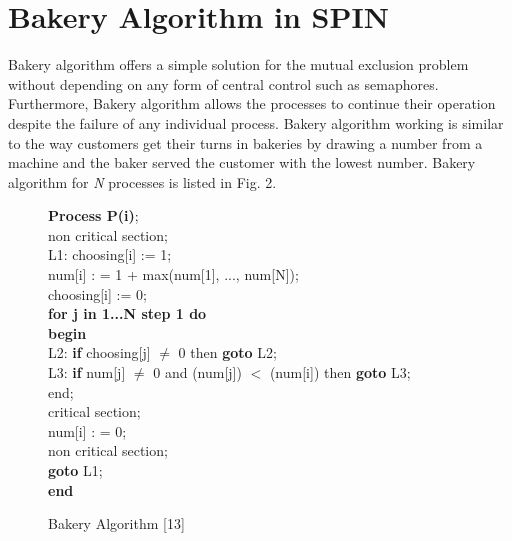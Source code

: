 \documentclass[conference]{IEEEtran}
\begin{document}
\section{Bakery Algorithm in SPIN}
Bakery algorithm \cite{13} offers a simple solution for the mutual exclusion problem without depending on any form of central control such 
as semaphores. Furthermore, Bakery algorithm allows the processes to continue their operation despite the failure of any individual process. 
Bakery algorithm working is similar to the way customers get their turns in bakeries by drawing a number from a machine and the baker served the 
customer with the lowest number. Bakery algorithm for \textit{N} processes is listed in Fig. 2.
\begin{figure}[!ht]
\hspace{0.2cm}\textbf{Process P(i)};\\
\hspace*{0.3cm}non critical section;\\
\hspace*{0.3cm}L1: choosing[i] := 1;\\
\hspace*{0.4cm}num[i] : = 1 + max(num[1], ..., num[N]);\\
\hspace*{0.4cm}choosing[i] := 0;\\
 \hspace*{0.4cm}\textbf{for j in 1...N step 1 do}\\
\hspace*{0.5cm}\textbf{begin}\\
\hspace*{0.5cm}L2: \textbf{if} choosing[j] $\neq$ 0 then \textbf{goto} L2;\\
\hspace*{0.5cm}L3: \textbf{if} num[j] $\neq$ 0 and (num[j]) $<$ (num[i]) then \textbf{goto} L3;\\
\hspace*{0.5cm}end;\\
\hspace*{0.4cm}critical section;\\
\hspace*{0.4cm}num[i] : = 0;\\
\hspace*{0.4cm}non critical section;\\
\hspace*{0.4cm}\textbf{goto} L1;\\
\hspace*{0.2cm}\textbf{end}
\caption{Bakery Algorithm [13]}
\end{figure}
\end{document}
